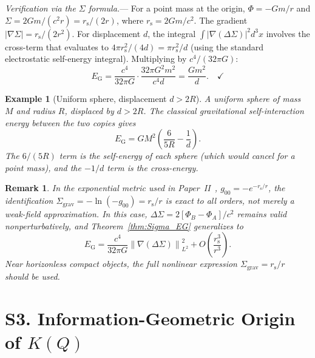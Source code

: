 \documentclass[letterpaper,twocolumn,superscriptaddress,longbibliography]{revtex4-2}
\newtheorem*{remark}{Remark}
\newtheorem{example}{Example}[section]
\newcommand{\norm}[1]{\left\|#1\right\|}
\newcommand{\rs}{r_{\mathrm{s}}}
\newcommand{\Sgrav}{\Sigma_{\mathrm{grav}}}
\newcommand{\EG}{E_{\mathrm{G}}}
\newcommand{\DSigma}{\Delta\Sigma}
\begin{document}
\emph{Verification via the $\Sigma$ formula.}---
For a point mass at the origin,
$\Phi = -Gm/r$ and $\Sigma = 2Gm/(c^2 r) = \rs/(2r)$,
where $\rs = 2Gm/c^2$.
The gradient $|\nabla\Sigma| = \rs/(2r^2)$.
For displacement $d$, the integral
$\int |\nabla(\DSigma)|^2 d^3x$ involves the cross-term
that evaluates to $4\pi \rs^2/(4d) = \pi \rs^2/d$
(using the standard electrostatic self-energy integral).
Multiplying by $c^4/(32\pi G)$:
\begin{equation}
  \EG = \frac{c^4}{32\pi G} \cdot \frac{32\pi G^2 m^2}{c^4 d}
      = \frac{Gm^2}{d}. \quad \checkmark
  \label{eq:point_verify}
\end{equation}

\begin{example}[Uniform sphere, displacement $d > 2R$]
\label{ex:sphere}
A uniform sphere of mass $M$ and radius $R$, displaced by $d > 2R$.
The classical gravitational self-interaction energy between
the two copies gives~\cite{Giulini2011}
\begin{equation}
  \EG = GM^2\!\left(\frac{6}{5R} - \frac{1}{d}\right).
  \label{eq:EG_sphere}
\end{equation}
The $6/(5R)$ term is the self-energy of each sphere (which would
cancel for a point mass), and the $-1/d$ term is the
cross-energy.
\end{example}

\begin{remark}
In the exponential metric used in Paper~II~\cite{PaperII},
$g_{00} = -e^{-\rs/r}$, the identification
$\Sgrav = -\ln(-g_{00}) = \rs/r$ is exact to all orders,
not merely a weak-field approximation.
In this case, $\DSigma = 2[\Phi_B - \Phi_A]/c^2$ remains
valid nonperturbatively, and Theorem~\ref{thm:Sigma_EG}
generalizes to
\begin{equation}
  \EG = \frac{c^4}{32\pi G}
        \norm{\nabla(\DSigma)}^2_{L^2}
        + O\!\left(\frac{\rs^3}{r^3}\right).
  \label{eq:EG_exact}
\end{equation}
Near horizonless compact objects, the full nonlinear
expression $\Sgrav = \rs/r$ should be used.
\end{remark}

\section{S3. Information-Geometric Origin of \texorpdfstring{$K(Q)$}{K(Q)}}
\label{sec:KQ}
\end{document}
